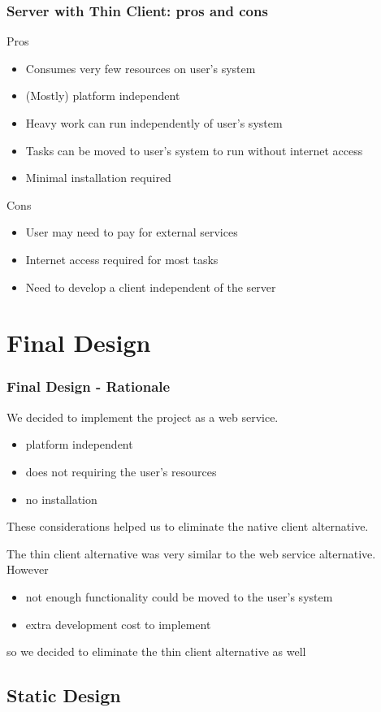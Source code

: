 \documentclass{beamer}
\begin{document}
\begin{frame}
\frametitle{Server with Thin Client: pros and cons}
Pros
\begin{itemize}
\item Consumes very few resources on user's system
\item (Mostly) platform independent
\item Heavy work can run independently of user's system
\item Tasks can be moved to user's system to run without internet access
\item Minimal installation required
\end{itemize}
Cons
\begin{itemize}
\item User may need to pay for external services
\item Internet access required for most tasks
\item Need to develop a client independent of the server
\end{itemize}
\end{frame}

\section{Final Design}
\begin{frame}
\frametitle{Final Design - Rationale}
We decided to implement the project as a web service. 
\begin{itemize}
\item platform independent
\item does not requiring the user's resources
\item no installation 
\end{itemize}
These considerations helped us to eliminate the native client alternative. \vspace{.3cm}

The thin client alternative was very similar to the web service alternative. However
\begin{itemize}
\item not enough functionality could be moved to the user's system 
\item extra development cost to implement 
\end{itemize}
so we decided to eliminate the thin client alternative as well
\end{frame}

\subsection{Static Design}
\end{document}
